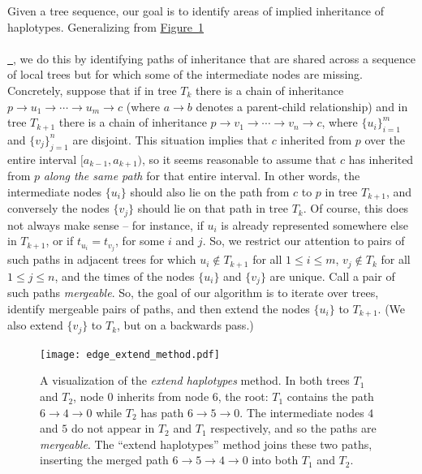 \documentclass[10pt,twoside,lineno]{gsajnl}
\newcommand*{\figref}[2][]{%
	\hyperref[{#2}]{%
		Figure~\ref*{#2}%
		\ifx\\#1\\%
		\else
		\,#1%
		\fi
	}%
}
\begin{document}
Given a tree sequence, our goal is to
identify areas of implied inheritance of haplotypes.
Generalizing from \figref{fig:extending_diagram},
we do this by identifying paths of inheritance that are shared across a sequence of local trees
but for which some of the intermediate nodes are missing.
Concretely, suppose that 
if in tree $T_k$ there is a chain of inheritance
$p \to u_1 \to \cdots \to u_m \to c$
(where $a \to b$ denotes a parent-child relationship)
and in tree $T_{k+1}$ there is a chain of inheritance
$p \to v_1 \to \cdots \to v_n \to c$,
where $\{u_i\}_{i=1}^m$ and $\{v_j\}_{j=1}^n$ are disjoint.
This situation implies that $c$ inherited from $p$ over the entire interval $[a_{k-1}, a_{k+1})$,
so it seems reasonable to assume that $c$ has inherited from $p$ \emph{along the same path} for that entire interval.
In other words, the intermediate nodes $\{u_i\}$ should also lie on the path from $c$ to $p$ in tree $T_{k+1}$,
and conversely the nodes $\{v_j\}$ should lie on that path in tree $T_k$.
Of course, this does not always make sense --
for instance, if $u_i$ is already represented somewhere else in $T_{k+1}$,
or if $t_{u_i} = t_{v_j}$, for some $i$ and $j$.
So, we restrict our attention to pairs of such paths in adjacent trees
for which
$u_i \notin T_{k+1}$ for all $1 \le i \le m$,
$v_j \notin T_k$ for all $1 \le j \le n$,
and the times of the nodes $\{u_i\}$ and $\{v_j\}$ are unique.
Call a pair of such paths \emph{mergeable}.
So, the goal of our algorithm is to iterate over trees,
identify mergeable pairs of paths,
and then extend the nodes $\{u_i\}$ to $T_{k+1}$.
(We also extend $\{v_j\}$ to $T_k$, but on a backwards pass.)

\begin{figure}[!ht]
\begin{center}
	\texttt{[image: edge\_extend\_method.pdf]}
\end{center}
\caption{A visualization of the \textit{extend haplotypes} method.
    In both trees $T_1$ and $T_2$,
    node 0 inherits from node 6, the root:
    $T_1$ contains the path $6\to 4\to 0$ while $T_2$ has path $6\to 5\to 0$.
    The intermediate nodes $4$ and $5$ do not appear in $T_2$ and $T_1$ respectively, and so the paths are \textit{mergeable}.
    The ``extend haplotypes'' method joins these two paths,
    inserting the merged path $6\to 5\to 4\to 0$ into both $T_1$ and $T_2$.
    \label{fig:extending_diagram}
}
\end{figure}
\end{document}
